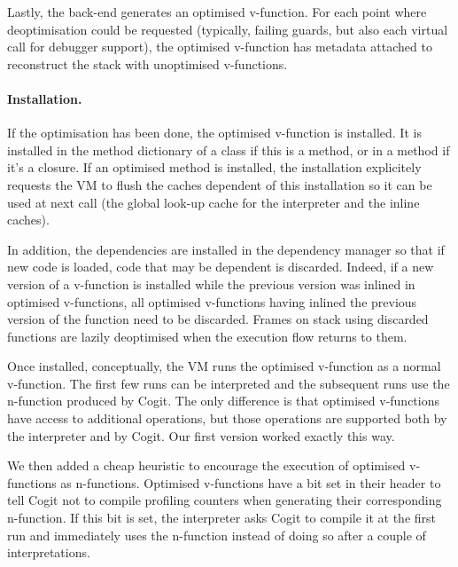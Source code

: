 \documentclass[a4paper,12pt,twoside]{../includes/ThesisStyle}
\begin{document}
Lastly, the back-end generates an optimised v-function. For each point where deoptimisation could be requested (typically, failing guards, but also each virtual call for debugger support), the optimised v-function has metadata attached to reconstruct the stack with unoptimised v-functions.

\paragraph{Installation.}

If the optimisation has been done, the optimised v-function is installed. It is installed in the method dictionary of a class if this is a method, or in a method if it's a closure. If an optimised method is installed, the installation explicitely requests the VM to flush the caches dependent of this installation so it can be used at next call (the global look-up cache for the interpreter and the inline caches).

In addition, the dependencies are installed in the dependency manager so that if new code is loaded, code that may be dependent is discarded. Indeed, if a new version of a v-function is installed while the previous version was inlined in optimised v-functions, all optimised v-functions having inlined the previous version of the function need to be discarded. Frames on stack using discarded functions are lazily deoptimised when the execution flow returns to them.

Once installed, conceptually, the VM runs the optimised v-function as a normal v-function. The first few runs can be interpreted and the subsequent runs use the n-function produced by Cogit. The only difference is that optimised v-functions have access to additional operations, but those operations are supported both by the interpreter and by Cogit. Our first version worked exactly this way.

We then added a cheap heuristic to encourage the execution of optimised v-functions as n-functions. Optimised v-functions have a bit set in their header to tell Cogit not to compile profiling counters when generating their corresponding n-function. If this bit is set, the interpreter asks Cogit to compile it at the first run and immediately uses the n-function instead of doing so after a couple of interpretations.
\end{document}
